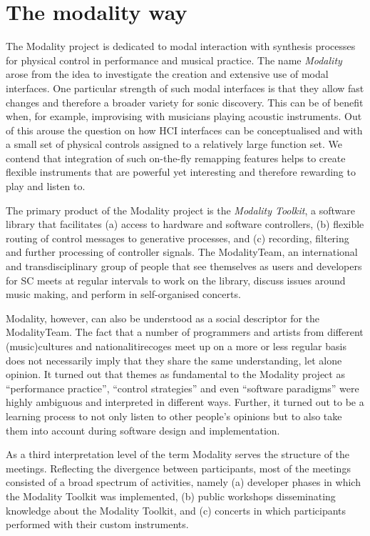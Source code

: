 \documentclass{article}
\begin{document}
\section{The modality way}
\label{sec:modal_control}

The Modality project is dedicated to modal interaction with synthesis processes for physical control in performance and musical practice.
The name \emph{Modality} arose from the idea to investigate the creation and extensive use of modal interfaces.
One particular strength of such modal interfaces is that they allow fast changes and therefore a broader variety for sonic discovery.
This can be of benefit when, for example, improvising with musicians playing acoustic instruments.
Out of this arouse the question on how HCI interfaces can be conceptualised and with a small set of physical controls assigned to a relatively large function set.
We contend that integration of such on-the-fly remapping features helps to create flexible instruments that are powerful yet interesting and therefore rewarding to play and listen to. 

The primary product of the Modality project is the \emph{Modality Toolkit}, a software library that facilitates (a) access to hardware and software controllers, (b) flexible routing of control messages to generative processes, and (c) recording, filtering and further processing of controller signals.
The ModalityTeam, an international and transdisciplinary group of people that see themselves as users and developers for SC meets at regular intervals to work on the library, discuss issues around music making, and perform in self-organised concerts.

Modality, however, can also be understood as a social descriptor for the ModalityTeam.
The fact that a number of programmers and artists from different (music)cultures and nationalitirecoges meet up on a more or less regular basis does not necessarily imply that they share the same  understanding, let alone opinion.
It turned out that themes as fundamental to the Modality project as ``performance practice'', ``control strategies'' and even ``software paradigms'' were highly ambiguous and interpreted in different ways.
Further, it turned out to be a learning process to not only listen to other people's opinions but to also take them into account during software design and implementation.

As a third interpretation level of the term Modality serves the structure of the meetings.
Reflecting the divergence between participants, most of the meetings consisted of a broad spectrum of activities, namely 
(a) developer phases in which the Modality Toolkit was implemented, 
(b) public workshops disseminating knowledge about the Modality Toolkit, and 
(c) concerts in which participants performed with their custom instruments.
\end{document}

